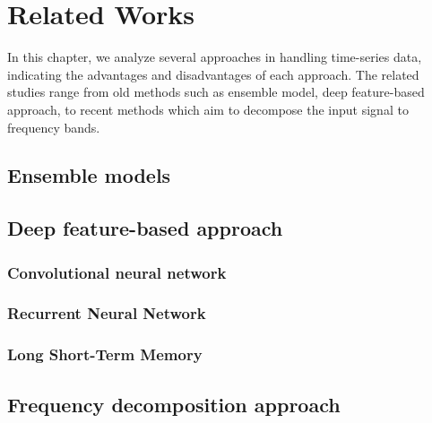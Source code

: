 
\chapter{Related Works}
\label{chap:related_work}

In this chapter, we analyze several approaches in handling time-series data, indicating the advantages and disadvantages of each approach. The related studies range from old methods such as ensemble model, deep feature-based approach, to recent methods which aim to decompose the input signal to frequency bands.

\section{Ensemble models}



\section{Deep feature-based approach}



\subsection{Convolutional neural network}


\subsection{Recurrent Neural Network}

\subsection{Long Short-Term Memory}


\section{Frequency decomposition approach}


